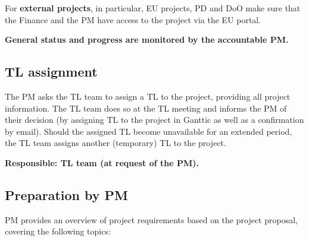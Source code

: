For \textbf{external projects}, in particular, EU projects, PD and DoO make sure that the Finance and the PM have access to the project via the EU portal.

\textbf{General status and progress are monitored by the accountable PM.}

\subsection{TL assignment}
\label{sec:init:tl-assign}
The PM asks the TL team to assign a TL to the project, providing all project information. The TL team does so at the TL
meeting and informs the PM of their decision (by assigning TL to the project in Ganttic as well as a confirmation by
email). Should the assigned TL become unavailable for an extended period, the TL team assigns another (temporary) TL to
the project.

\textbf{Responsible: TL team (at request of the PM).}

\subsection{Preparation by PM}
PM provides an overview of project requirements based on the project proposal, covering the following topics:

